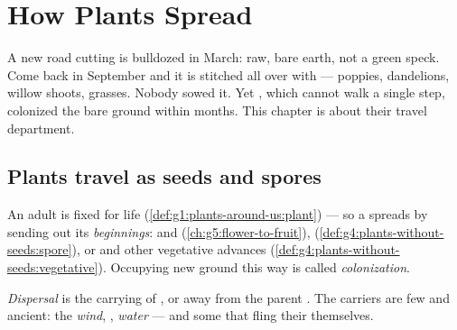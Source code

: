\chapter{How Plants Spread}\label{ch:g6:how-plants-spread}

A new road cutting is bulldozed in March: raw, bare earth, not
a green speck. Come back in September and it is stitched all
over with  --- poppies, dandelions, willow shoots,
grasses. Nobody sowed it. Yet , which cannot walk a
single step, colonized the bare ground within months. This
chapter is about their travel department.

\section{Plants travel as seeds and spores}

\begin{proposition}\label{prop:g6:how-plants-spread:travel}
An adult  is fixed for life
(\cref{def:g1:plants-around-us:plant}) --- so a 
spreads by sending out its \emph{beginnings}:  and
 (\cref{ch:g5:flower-to-fruit}), 
(\cref{def:g4:plants-without-seeds:spore}), or  and
other vegetative advances
(\cref{def:g4:plants-without-seeds:vegetative}). Occupying
new ground this way is called
\emph{colonization}.
\end{proposition}
\admitted

\begin{definition}[Dispersal]\label{def:g6:how-plants-spread:dispersal}
\emph{Dispersal} is the carrying of ,
 or  away from the parent . The carriers are
few and ancient: the \emph{wind}, \emph{},
\emph{water} --- and some  that fling their 
themselves.
\end{definition}

